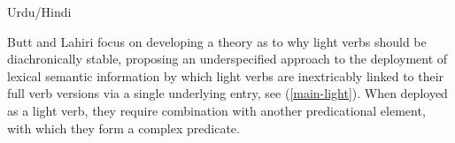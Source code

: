 \documentclass[output=paper,hidelinks]{langscibook}
\begin{document}
\begin{exe} 
\ex \label{urdu-go} Urdu/Hindi
\begin{xlist}





\end{xlist}
\end{exe}


Butt and Lahiri focus on developing a theory as to why light verbs should be diachronically stable, proposing an underspecified approach to the deployment of lexical semantic information by which light verbs are inextricably linked to their full verb versions via a single underlying entry, see (\ref{main-light}). When deployed as a light verb, they require combination with another predicational element, with which they form a complex predicate. 
 
\end{document}
